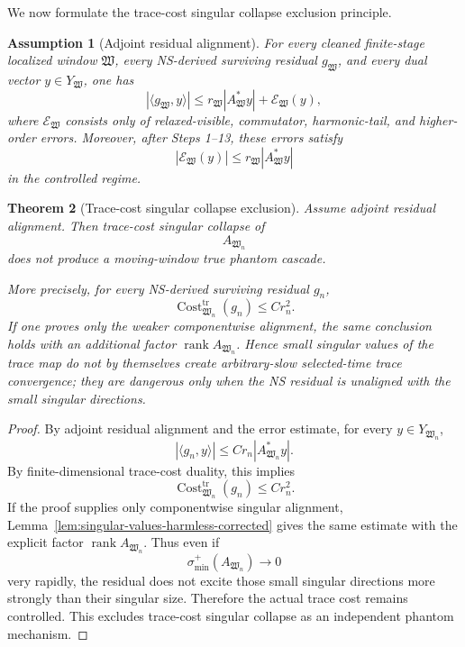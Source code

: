 \documentclass[11pt]{article}
\numberwithin{equation}{section}
\newtheorem{theorem}{Theorem}[section]
\newtheorem{assumption}[theorem]{Assumption}
\begin{document}
We now formulate the trace-cost singular collapse exclusion principle.

\begin{assumption}[Adjoint residual alignment]
For every cleaned finite-stage localized window \(\mathfrak W\), every NS-derived surviving residual \(g_{\mathfrak W}\), and every dual vector \(y\in Y_{\mathfrak W}\), one has
\begin{equation}
|\langle g_{\mathfrak W},y\rangle|
\le
r_{\mathfrak W}|A_{\mathfrak W}^*y|
+
\mathcal E_{\mathfrak W}(y),
\label{eq:tag-10-240}
\end{equation}
where \(\mathcal E_{\mathfrak W}\) consists only of relaxed-visible, commutator, harmonic-tail, and higher-order errors. Moreover, after Steps 1--13, these errors satisfy
\begin{equation}
|\mathcal E_{\mathfrak W}(y)|
\le
r_{\mathfrak W}|A_{\mathfrak W}^*y|
\label{eq:tag-10-241}
\end{equation}
in the controlled regime.
\end{assumption}

\begin{theorem}[Trace-cost singular collapse exclusion]
Assume adjoint residual alignment. Then trace-cost singular collapse of
\[
A_{\mathfrak W_n}
\]
does not produce a moving-window true phantom cascade.

More precisely, for every NS-derived surviving residual \(g_n\),
\begin{equation}
\operatorname{Cost}^{\operatorname{tr}}_{\mathfrak W_n}(g_n)
\le
C r_n^2.
\label{eq:tag-10-242}
\end{equation}
If one proves only the weaker componentwise alignment, the same conclusion holds with an additional factor \(\operatorname{rank}A_{\mathfrak W_n}\). Hence small singular values of the trace map do not by themselves create arbitrary-slow selected-time trace convergence; they are dangerous only when the NS residual is unaligned with the small singular directions.
\end{theorem}

\begin{proof}
By adjoint residual alignment and the error estimate, for every \(y\in Y_{\mathfrak W_n}\),
\[
|\langle g_n,y\rangle|
\le
C r_n|A_{\mathfrak W_n}^*y|.
\]
By finite-dimensional trace-cost duality, this implies
\[
\operatorname{Cost}^{\operatorname{tr}}_{\mathfrak W_n}(g_n)
\le
C r_n^2.
\]
If the proof supplies only componentwise singular alignment, Lemma~\ref{lem:singular-values-harmless-corrected} gives the same estimate with the explicit factor \(\operatorname{rank}A_{\mathfrak W_n}\).  Thus even if
\[
\sigma_{\min}^+(A_{\mathfrak W_n})\to0
\]
very rapidly, the residual does not excite those small singular directions more strongly than their singular size. Therefore the actual trace cost remains controlled. This excludes trace-cost singular collapse as an independent phantom mechanism.
\end{proof}
\end{document}
